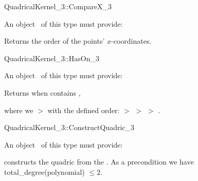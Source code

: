 \begin{ccRefFunctionObjectConcept}{QuadricalKernel_3::CompareX_3}


An object \ccVar\ of this type must provide:

{Returns the order of the points' $x$-coordinates.}

\end{ccRefFunctionObjectConcept}


\begin{ccRefFunctionObjectConcept}{QuadricalKernel_3::HasOn_3}


An object \ccVar\ of this type must provide:

{Returns  when  contains ,}

where we  $>$  with the defined order:
 $>$ 
 $>$ 
 $>$ 
.

\end{ccRefFunctionObjectConcept}


\begin{ccRefFunctionObjectConcept}{QuadricalKernel_3::ConstructQuadric_3}


An object \ccVar\ of this type must provide:

{constructs the quadric from the . As a precondition
we have total\_degree(polynomial) $\leq 2$.}

\end{ccRefFunctionObjectConcept}


